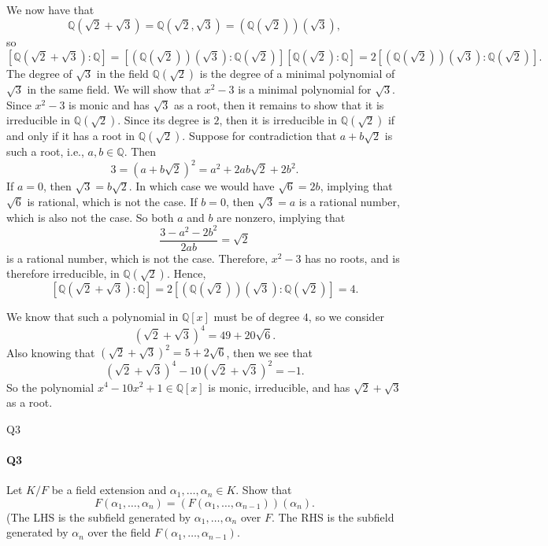 \documentclass[12pt]{article}
\newenvironment{fullbox}{\begin{lrbox}{\savefullbox}\begin{minipage}{\dimexpr\textwidth-2\fboxsep\relax}}{\end{minipage}\end{lrbox}\begin{center}\framebox[\textwidth]{\usebox{\savefullbox}}\end{center}}
\newenvironment{pbox}[1][]{\begin{fullbox}\ifx#1\empty\else\paragraph{#1}\fi}{\end{fullbox}}
\theoremstyle{definition}
\newcommand{\Q}{\mathbb{Q}}
\begin{document}
We now have that
\[
    \Q(\sqrt{2} + \sqrt{3}) = \Q(\sqrt{2}, \sqrt{3}) = (\Q(\sqrt{2}))(\sqrt{3}),
\]
so
\[
    [\Q(\sqrt{2} + \sqrt{3}) : \Q] = [(\Q(\sqrt{2}))(\sqrt{3}) : \Q(\sqrt{2})][\Q(\sqrt{2}) : \Q] = 2[(\Q(\sqrt{2}))(\sqrt{3}) : \Q(\sqrt{2})].
\]
The degree of $\sqrt{3}$ in the field $\Q(\sqrt{2})$ is the degree of a minimal polynomial of $\sqrt{3}$ in the same field. We will show that $x^2 - 3$ is a minimal polynomial for $\sqrt{3}$. Since $x^2 - 3$ is monic and has $\sqrt{3}$ as a root, then it remains to show that it is irreducible in $\Q(\sqrt{2})$. Since its degree is $2$, then it is irreducible in $\Q(\sqrt{2})$ if and only if it has a root in $\Q(\sqrt{2})$. Suppose for contradiction that $a + b\sqrt{2}$ is such a root, i.e., $a, b \in \Q$. Then
\[
    3 = (a + b\sqrt{2})^2 = a^2 + 2ab\sqrt{2} + 2b^2.
\]
If $a = 0$, then $\sqrt{3} = b\sqrt{2}$. In which case we would have $\sqrt{6} = 2b$, implying that $\sqrt{6}$ is rational, which is not the case. If $b = 0$, then  $\sqrt{3} = a$ is a rational number, which is also not the case. So both $a$ and $b$ are nonzero, implying that
\[
    \frac{3 - a^2 - 2b^2}{2ab} = \sqrt{2}
\]
is a rational number, which is not the case. Therefore, $x^2 - 3$ has no roots, and is therefore irreducible, in $\Q(\sqrt{2})$. Hence,
\[
    [\Q(\sqrt{2} + \sqrt{3}) : \Q] = 2[(\Q(\sqrt{2}))(\sqrt{3}) : \Q(\sqrt{2})] = 4.
\]

We know that such a polynomial in $\Q[x]$ must be of degree $4$, so we consider
\[
    (\sqrt{2} + \sqrt{3})^4 = 49 + 20\sqrt{6}.
\]
Also knowing that $(\sqrt{2} + \sqrt{3})^2 = 5 + 2\sqrt{6}$, then we see that
\[
    (\sqrt{2} + \sqrt{3})^4 - 10(\sqrt{2} + \sqrt{3})^2 = -1.
\]
So the polynomial $x^4 - 10x^2 + 1 \in \Q[x]$ is monic, irreducible, and has $\sqrt{2} + \sqrt{3}$ as a root.

\newpage
\begin{pbox}[Q3]
    Let $K/F$ be a field extension and $\alpha_1, \dots, \alpha_n \in K$. Show that
    \[
        F(\alpha_1, \dots, \alpha_n) = (F(\alpha_1, \dots, \alpha_{n-1}))(\alpha_n).
    \]
    (The LHS is the subfield generated by $\alpha_1, \dots, \alpha_n$ over $F$. The RHS is the subfield generated by $\alpha_n$ over the field $F(\alpha_1, \dots, \alpha_{n-1})$.
\end{pbox}
\end{document}
